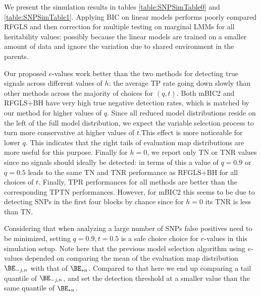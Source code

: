 We present the simulation results in tables \ref{table:SNPSimTable0} and \ref{table:SNPSimTable1}. Applying BIC on linear models performs poorly compared RFGLS and then correction for multiple testing on marginal LMMs for all heritability values: possibly because the linear models are trained on a smaller amount of data and ignore the variation due to shared environment in the parents.

Our proposed $e$-values work better than the two methods for detecting true signals across different values of $h$: the average TP rate going down slowly than other methods across the majority of choices for $(q,t)$. Both mBIC2 and RFGLS+BH have very high true negative detection rates, which is matched by our method for higher values of $q$. Since all reduced model distributions reside on the left of the full model distribution, we expect the variable selection process to turn more conservative at higher values of $t$.This effect is more noticeable for lower $q$. This indicates that the right tails of evaluation map distributions are more useful for this purpose. Finally for $h=0$, we report only TN or TNR values since no signals should ideally be detected: in terms of this a value of $q=0.9$ or $q=0.5$ leads to the same TN and TNR performance as RFGLS+BH for all choices of $t$. Finally, TPR performances for all methods are better than the corresponding TPTN performances. However, for mBIC2 this seems to be due to detecting SNPs in the first four blocks by chance since for $h=0$ its TNR is less than TN.

Considering that when analyzing a large number of SNPs false positives need to be minimized, setting $q=0.9, t=0.5$ is a safe choice choice for $e$-values in this simulation setup. Note here that the previous model selection algorithm using $e$-values depended on comparing the mean of the evaluation map distribution $\BE_{-j,n}$ with that of $\BE_{* n}$. Compared to that here we end up comparing a tail quantile of $\BE_{-j,n}$, and set the detection threshold at a smaller value than the same quantile of $\BE_{* n}$.